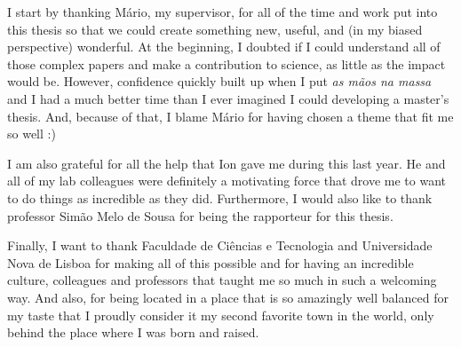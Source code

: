 
%

\begin{ntacknowledgements}

I start by thanking Mário, my supervisor, for all of the time and work put into this thesis so that we could create something new, useful, and (in my biased perspective) wonderful. 
At the beginning, I doubted if I could understand all of those complex papers and make a contribution to science, as little as the impact would be.
However, confidence quickly built up when I put \emph{as mãos na massa} and I had a much better time than I ever imagined I could developing a master's thesis.
And, because of that, I blame Mário for having chosen a theme that fit me so well :)

I am also grateful for all the help that Ion gave me during this last year.
He and all of my lab colleagues were definitely a motivating force that drove me to want to do things as incredible as they did.
Furthermore, I would also like to thank professor Simão Melo de Sousa for being the rapporteur for this thesis.

Finally, I want to thank Faculdade de Ciências e Tecnologia and Universidade Nova de Lisboa for making all of this possible and for having an incredible culture, colleagues and professors that taught me so much in such a welcoming way.
And also, for being located in a place that is so amazingly well balanced for my taste that I proudly consider it my second favorite town in the world, only behind the place where I was born and raised.

\iffalse
Acknowledgments are personal text and should be a free expression of the author.
However, without any intention of conditioning the form or content of this text, I would like to add that it usually starts with academic thanks (instructors, etc.); then institutional thanks (Research Center, Department, Faculty, University, FCT / MEC scholarships, etc.) and, finally, the personal ones (friends, family, etc.).
But I insist that there are no fixed rules for this text, and it must, above all, express what the author feels.
\fi

\end{ntacknowledgements}
